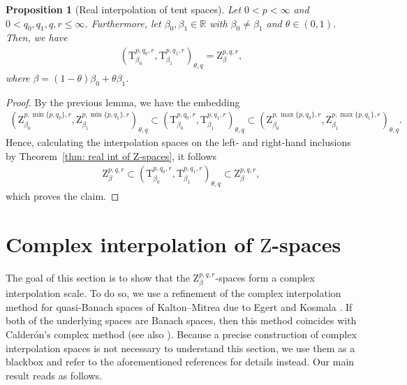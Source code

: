 \documentclass[11pt, leqno,parskip=half]{amsart}
\newtheorem{proposition}[theorem]{Proposition}
\theoremstyle{definition}
\newcommand{\IR}{\mathbb{R}}
\renewcommand{\T}{\mathrm{T}}
\newcommand{\Z}{\mathrm{Z}}
\numberwithin{equation}{section}
\begin{document}
\begin{proposition}[Real interpolation of tent spaces]
\label{prop: real int tent space}
    Let $0<p<\infty$ and $0< q_0,q_1,q, r\leq \infty$. Furthermore, let $\beta_0,\beta_1\in\IR$ with $\beta_0\neq \beta_1$ and $\theta\in (0,1)$. Then, we have
    \begin{align*}
        (\T^{p,q_0,r}_{\beta_0} , \T^{p,q_1,r}_{\beta_1} )_{\theta, q} = \Z^{p,q,r}_\beta,
    \end{align*}
    where $\beta = (1-\theta)\beta_0 + \theta \beta_1$.
\end{proposition}

\begin{proof}
    By the previous lemma, we have the embedding
    \begin{align*}
        (\Z^{p,\min\{p,q_0\},r}_{\beta_0} , \Z^{p,\min\{p,q_1\},r}_{\beta_1} )_{\theta, q}\subset (\T^{p,q_0,r}_{\beta_0} , \T^{p,q_1,r}_{\beta_1} )_{\theta, q} \subset  (\Z^{p,\max\{p,q_0\},r}_{\beta_0} , \Z^{p,\max\{p,q_1\},r}_{\beta_1} )_{\theta, q}.
    \end{align*}
    Hence, calculating the interpolation spaces on the left- and right-hand inclusions by Theorem~\ref{thm: real int of Z-spaces}, it follows
    \begin{align*}
        \Z^{p,q,r}_\beta \subset(\T^{p,q_0,r}_{\beta_0} , \T^{p,q_1,r}_{\beta_1} )_{\theta, q} \subset \Z^{p,q,r}_\beta,
    \end{align*}
    which proves the claim.
\end{proof}
\section{Complex interpolation of $\Z$-spaces}
\label{sec: complex int}

\noindent The goal of this section is to show that the $\Z^{p,q,r}_{\beta}$-spaces form a complex interpolation scale. To do so, we use a refinement of the complex interpolation method for quasi-Banach spaces of Kalton--Mitrea \cite{Kalton_Mitrea} due to Egert and Kosmala \cite{Egert_Kosmala}. If both of the underlying spaces are Banach spaces, then this method coincides with Calderón's complex method \cite{Calderon} (see also \cite[Chp.\@ 4]{Bergh_Loefstroem}). Because a precise construction of complex interpolation spaces is not necessary to understand this section, we use them as a blackbox and refer to the aforementioned references for details instead. Our main result reads as follows.
\end{document}
